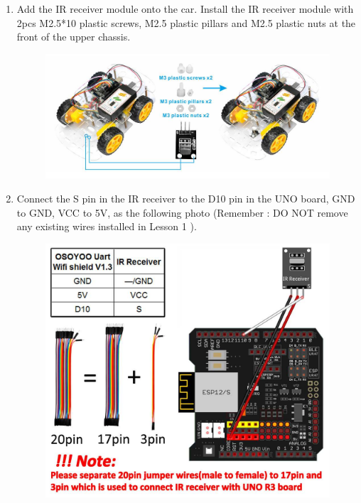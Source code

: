 \documentclass{article}
\begin{document}
\begin{enumerate}
	\item Add the IR receiver module onto the car. Install the IR receiver module with 2pcs M2.5*10 plastic screws, M2.5 plastic pillars and M2.5 plastic nuts at the front of the upper chassis.
	
	\begin{figure}[H]
		\centering
		\includegraphics[width=0.7\linewidth]{Images/e1}
		\label{fig:e1}
	\end{figure}
	
	\item Connect the S pin in the IR receiver to the D10 pin in the UNO board, GND to GND, VCC to 5V, as the following photo (Remember : DO NOT remove any existing wires installed in Lesson 1 ).
	
	\begin{figure}[H]
		\centering
		\includegraphics[width=0.5\linewidth]{Images/e2}
		\label{fig:e2}
	\end{figure}

\end{enumerate}
\end{document}
